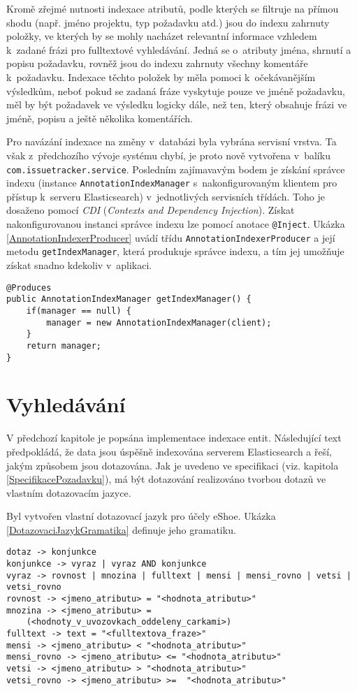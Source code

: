 \documentclass[11pt,oneside]{fithesis2}
\begin{document}
Kromě zřejmé nutnosti indexace atributů, podle kterých se filtruje na přímou shodu (např. jméno projektu, typ požadavku atd.) jsou do indexu zahrnuty položky, ve kterých by se mohly nacházet relevantní informace vzhledem k~zadané frázi pro fulltextové vyhledávání. Jedná se o~atributy jména, shrnutí a popisu požadavku, rovněž jsou do indexu zahrnuty všechny komentáře k~požadavku. Indexace těchto položek by měla pomoci k~očekávanějším výsledkům, neboť pokud se zadaná fráze vyskytuje pouze ve jméně požadavku, měl by být požadavek ve výsledku logicky dále, než ten, který obsahuje frázi ve jméně, popisu a ještě několika komentářích.

Pro navázání indexace na změny v~databázi byla vybrána servisní vrstva. Ta však z~předchozího vývoje systému chybí, je proto nově vytvořena v~balíku \texttt{com.issuetracker.service}. Posledním zajímavavým bodem je získání správce indexu (instance \texttt{AnnotationIndexManager} s~nakonfigurovaným klientem pro přístup k~serveru Elasticsearch) v~jednotlivých servisních třídách. Toho je dosaženo pomocí \emph{CDI} (\emph{Contexts and Dependency Injection}). Získat nakonfigurovanou instanci správce indexu lze pomocí anotace \texttt{@Inject}. Ukázka \ref{AnnotationIndexerProducer} uvádí třídu \texttt{AnnotationIndexerProducer} a její metodu \texttt{getIndexManager}, která produkuje správce indexu, a tím jej umožňuje získat snadno kdekoliv v~aplikaci.

\begin{lstlisting}[caption =  Použití CDI pro získávání správce indexu, label = AnnotationIndexerProducer]
@Produces
public AnnotationIndexManager getIndexManager() {
    if(manager == null) {
        manager = new AnnotationIndexManager(client);
    }
    return manager;
}
\end{lstlisting}

\section{Vyhledávání}
\label{ImplementaceVyhledavani}
V předchozí kapitole je popsána implementace indexace entit. Následující text předpokládá, že data jsou úspěšně indexována serverem Elasticsearch a řeší, jakým způsobem jsou dotazována. Jak je uvedeno ve specifikaci (viz. kapitola \ref{SpecifikacePozadavku}), má být dotazování realizováno tvorbou dotazů ve vlastním dotazovacím jazyce.

Byl vytvořen vlastní dotazovací jazyk pro účely eShoe. Ukázka \ref{DotazovaciJazykGramatika} definuje jeho gramatiku.
\begin{lstlisting}[caption =  Gramatika dotazovacího jazyka eShoe, label = DotazovaciJazykGramatika]
dotaz -> konjunkce
konjunkce -> vyraz | vyraz AND konjunkce
vyraz -> rovnost | mnozina | fulltext | mensi | mensi_rovno | vetsi | vetsi_rovno
rovnost -> <jmeno_atributu> = "<hodnota_atributu>"
mnozina -> <jmeno_atributu> = 
	(<hodnoty_v_uvozovkach_oddeleny_carkami>)
fulltext -> text = "<fulltextova_fraze>"
mensi -> <jmeno_atributu> < "<hodnota_atributu>"
mensi_rovno -> <jmeno_atributu> <= "<hodnota_atributu>"
vetsi -> <jmeno_atributu> > "<hodnota_atributu>"
vetsi_rovno -> <jmeno_atributu> >=  "<hodnota_atributu>"
\end{lstlisting}
\end{document}
